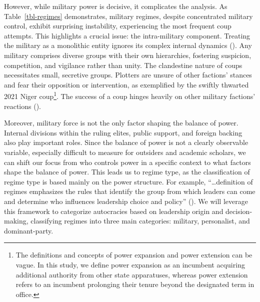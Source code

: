 \documentclass[
  12pt,
]{report}
\begin{document}
However, while military power is decisive, it complicates the analysis.
As Table~\ref{tbl-regimes} demonstrates, military regimes, despite
concentrated military control, exhibit surprising instability,
experiencing the most frequent coup attempts. This highlights a crucial
issue: the intra-military component. Treating the military as a
monolithic entity ignores its complex internal dynamics
(). Any military comprises diverse
groups with their own hierarchies, fostering suspicion, competition, and
vigilance rather than unity. The clandestine nature of coups
necessitates small, secretive groups. Plotters are unsure of other
factions' stances and fear their opposition or intervention, as
exemplified by the swiftly thwarted 2021 Niger coup\footnote{The
  definitions and concepts of power expansion and power extension can be
  vague. In this study, we define power expansion as an incumbent
  acquiring additional authority from other state apparatuses, whereas
  power extension refers to an incumbent prolonging their tenure beyond
  the designated term in office.}. The success of a coup hinges heavily
on other military factions' reactions ().

Moreover, military force is not the only factor shaping the balance of
power. Internal divisions within the ruling elites, public support, and
foreign backing also play important roles. Since the balance of power is
not a clearly observable variable, especially difficult to measure for
outsiders and academic scholars, we can shift our focus from who
controls power in a specific context to what factors shape the balance
of power. This leads us to regime type, as the classification of regime
type is based mainly on the power structure. For example,
``\ldots definition of regimes emphasizes the rules that identify the
group from which leaders can come and determine who influences
leadership choice and policy'' (). We will leverage this framework to
categorize autocracies based on leadership origin and decision-making,
classifying regimes into three main categories: military, personalist,
and dominant-party.
\end{document}
